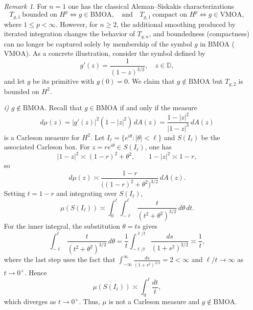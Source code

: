 \documentclass[preprint,12pt]{elsarticle}
\numberwithin{equation}{section}
\theoremstyle{remark}
\newtheorem{remark}{Remark}[section]
\begin{document}
\begin{remark}\label{rem:BMOA_fails_nge2}
For $n=1$ one has the classical Aleman--Siskakis characterizations
\begin{equation*}
T_{g,1}\ \text{bounded on }H^p \iff g\in \mathrm{BMOA},
\quad\text{and}\quad
T_{g,1}\ \text{compact on }H^p \iff g\in \mathrm{VMOA},
\end{equation*}
where $1\le p<\infty$.
However, for $n\ge2$, the additional smoothing produced by iterated
integration changes the behavior of $T_{g,n}$, and boundedness
(compactness) can no longer be captured solely by membership of the
symbol $g$ in $\mathrm{BMOA}$ ($\mathrm{VMOA}$). As a concrete
illustration, consider the symbol defined by
\begin{equation*}
g'(z)=\frac{1}{(1-z)^{3/2}},\quad z\in\mathbb{D},
\end{equation*}
and let $g$ be its primitive with $g(0)=0$. We claim that
$g\notin\mathrm{BMOA}$ but $T_{g,2}$ is bounded on $H^2$.

\smallskip
\noindent\textit{i) $g\notin\mathrm{BMOA}$.}
Recall that $g\in \mathrm{BMOA}$ if and only if the measure
\begin{equation*}
d\mu(z)=|g'(z)|^2(1-|z|^2)\,dA(z)
= \frac{1-|z|^2}{|1-z|^{3}}\,dA(z)
\end{equation*}
is a Carleson measure for $H^2$.
Let $I_\ell=\{e^{i\theta}:|\theta|<\ell\}$ and $S(I_\ell)$ be the
associated Carleson box. For $z=re^{i\theta}\in S(I_\ell)$, one has
\begin{equation*}
|1-z|^2 \asymp (1-r)^2+\theta^2,\qquad 1-|z|^2\asymp 1-r,
\end{equation*}
so
\begin{equation*}
d\mu(z)\asymp \frac{1-r}{\bigl((1-r)^2+\theta^2\bigr)^{3/2}}\,dA(z).
\end{equation*}
Setting $t=1-r$ and integrating over $S(I_\ell)$,
\begin{equation*}
\mu(S(I_\ell))
\asymp \int_0^\ell \int_{-\ell}^{\ell}
\frac{t}{(t^2+\theta^2)^{3/2}}\, d\theta\, dt.
\end{equation*}
For the inner integral, the substitution $\theta = ts$ gives
\begin{equation*}
\int_{-\ell}^{\ell} \frac{t}{(t^2+\theta^2)^{3/2}}\,d\theta
= \frac{1}{t}\int_{-\ell/t}^{\ell/t}\frac{ds}{(1+s^2)^{3/2}}
\asymp \frac{1}{t},
\end{equation*}
where the last step uses the fact that
$\int_{-\infty}^{\infty}\frac{ds}{(1+s^2)^{3/2}}=2<\infty$
and $\ell/t\to\infty$ as $t\to 0^+$. Hence
\begin{equation*}
\mu(S(I_\ell))
\asymp \int_0^\ell \frac{dt}{t},
\end{equation*}
which diverges as $t\to 0^+$. Thus, $\mu$ is not a Carleson measure
and $g\notin \mathrm{BMOA}$.


\end{remark}
\end{document}

